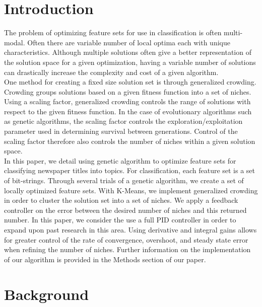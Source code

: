 \documentclass{sig-alternate}
\begin{document}


\section{Introduction}
The problem of optimizing feature sets for use in classification is often multi-modal. Often there are variable number of local optima each with unique characteristics. Although multiple solutions often give a better representation of the solution space for a given optimization, having a variable number of solutions can drastically increase the complexity and cost of a given algorithm.\\
\indent One method for creating a fixed size solution set is through generalized crowding. Crowding groups solutions based on a given fitness function into a set of niches\cite{ole:feedback}. Using a scaling factor, generalized crowding controls the range of solutions  with respect to the given fitness function. In the case of evolutionary algorithms such as genetic algorithms, the scaling factor controls the exploration/exploitation parameter used in determining survival between generations. Control of the scaling factor therefore also controls the number of niches within a given solution space\cite{ole:feedback}.\\
\indent In this paper, we detail using genetic algorithm to optimize feature sets for classifying newspaper titles into topics. For classification, each feature set is a set of bit-strings. Through several trials of a genetic algorithm, we create a set of locally optimized feature sets. With K-Means, we implement generalized crowding in order to cluster the solution set into a set of niches. We apply a feedback controller on the error between the desired number of niches and this returned number. In this paper, we consider the use a full PID controller in order to expand upon past research in this area. Using derivative and integral gains allows for greater control of the rate of convergence, overshoot, and steady state error when refining the number of  niches. Further information on the implementation of our algorithm is provided in the Methods section of our paper.  

\section{Background}
\end{document}
